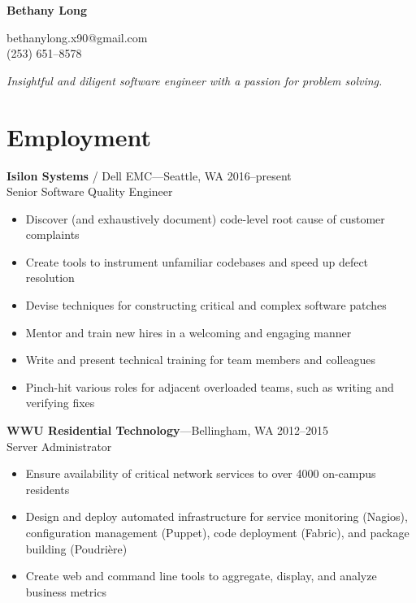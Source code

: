 \documentclass[11pt, letterpaper]{article}
\begin{document}
\clearpage
\thispagestyle{empty}

\begin{minipage}[c]{0.5\textwidth}
\textbf{\huge{Bethany Long}}
\end{minipage}
\hfill
\begin{minipage}[c]{0.4\textwidth}
\phantom{.} \hfill \small{bethanylong.x90@gmail.com}\\
\phantom{.} \hfill \small{(253) 651--8578}
\end{minipage}

\bigskip

\smallskip

\small{\textit{Insightful and diligent software engineer with a passion for problem solving.}}

\hrulefill

\section*{Employment}

\textbf{Isilon Systems} / Dell EMC---Seattle, WA \hfill 2016--present\\
Senior Software Quality Engineer

\begin{itemize}
    \item Discover (and exhaustively document) code-level root cause of customer complaints
    \item Create tools to instrument unfamiliar codebases and speed up defect resolution
    \item Devise techniques for constructing critical and complex software patches
    \item Mentor and train new hires in a welcoming and engaging manner
    \item Write and present technical training for team members and colleagues
    \item Pinch-hit various roles for adjacent overloaded teams, such as writing and verifying fixes
\end{itemize}

\bigskip

\textbf{WWU Residential Technology}---Bellingham, WA \hfill 2012--2015\\
Server Administrator

\begin{itemize}
    \item Ensure availability of critical network services to over 4000 on-campus residents
    \item Design and deploy automated infrastructure for service monitoring (Nagios), configuration management (Puppet), code deployment (Fabric), and package building (Poudri\`{e}re)
    \item Create web and command line tools to aggregate, display, and analyze business metrics
\end{itemize}
\end{document}
